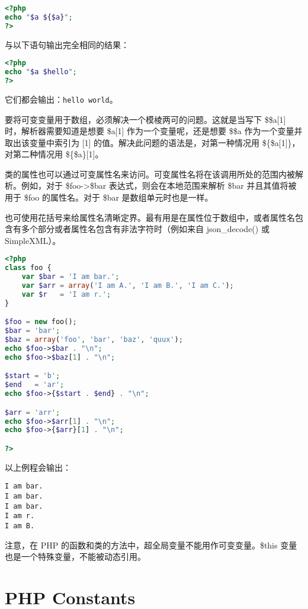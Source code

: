 \begin{lstlisting}[language=PHP]
<?php
echo "$a ${$a}";
?>
\end{lstlisting}

与以下语句输出完全相同的结果：

\begin{lstlisting}[language=PHP]
<?php
echo "$a $hello";
?>
\end{lstlisting}

它们都会输出：\verb|hello world|。



要将可变变量用于数组，必须解决一个模棱两可的问题。这就是当写下 \$\$a[1] 时，解析器需要知道是想要 \$a[1] 作为一个变量呢，还是想要 \$\$a 作为一个变量并取出该变量中索引为 [1] 的值。解决此问题的语法是，对第一种情况用 \$\{\$a[1]\}，对第二种情况用 \$\{\$a\}[1]。

类的属性也可以通过可变属性名来访问。可变属性名将在该调用所处的范围内被解析。例如，对于 \$foo->\$bar 表达式，则会在本地范围来解析 \$bar 并且其值将被用于 \$foo 的属性名。对于 \$bar 是数组单元时也是一样。

也可使用花括号来给属性名清晰定界。最有用是在属性位于数组中，或者属性名包含有多个部分或者属性名包含有非法字符时（例如来自 json\_decode() 或 SimpleXML）。




\begin{lstlisting}[language=PHP]
<?php
class foo {
    var $bar = 'I am bar.';
    var $arr = array('I am A.', 'I am B.', 'I am C.');
    var $r   = 'I am r.';
}

$foo = new foo();
$bar = 'bar';
$baz = array('foo', 'bar', 'baz', 'quux');
echo $foo->$bar . "\n";
echo $foo->$baz[1] . "\n";

$start = 'b';
$end   = 'ar';
echo $foo->{$start . $end} . "\n";

$arr = 'arr';
echo $foo->$arr[1] . "\n";
echo $foo->{$arr}[1] . "\n";

?>
\end{lstlisting}


以上例程会输出：

\begin{verbatim}
I am bar.
I am bar.
I am bar.
I am r.
I am B.
\end{verbatim}

注意，在 PHP 的函数和类的方法中，超全局变量不能用作可变变量。\$this 变量也是一个特殊变量，不能被动态引用。


\chapter{PHP Constants}

